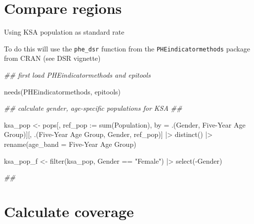 \documentclass[
  letterpaper,
  DIV=11,
  numbers=noendperiod]{scrreprt}
\newenvironment{Shaded}{\begin{snugshade}}{\end{snugshade}}
\newcommand{\AttributeTok}[1]{\textcolor[rgb]{0.40,0.45,0.13}{#1}}
\newcommand{\DocumentationTok}[1]{\textcolor[rgb]{0.37,0.37,0.37}{\textit{#1}}}
\newcommand{\ErrorTok}[1]{\textcolor[rgb]{0.68,0.00,0.00}{#1}}
\newcommand{\FunctionTok}[1]{\textcolor[rgb]{0.28,0.35,0.67}{#1}}
\newcommand{\NormalTok}[1]{\textcolor[rgb]{0.00,0.23,0.31}{#1}}
\newcommand{\OtherTok}[1]{\textcolor[rgb]{0.00,0.23,0.31}{#1}}
\newcommand{\SpecialCharTok}[1]{\textcolor[rgb]{0.37,0.37,0.37}{#1}}
\newcommand{\StringTok}[1]{\textcolor[rgb]{0.13,0.47,0.30}{#1}}
\begin{document}
\section{Compare regions}\label{compare-regions}

Using KSA population as standard rate

To do this will use the \texttt{phe\_dsr} function from the
\texttt{PHEindicatormethods} package from CRAN (see DSR vignette)

\begin{Shaded}
\begin{Highlighting}[]
\DocumentationTok{\#\# first load PHEindicatormethods and epitools}

\FunctionTok{needs}\NormalTok{(PHEindicatormethods, epitools)}

\DocumentationTok{\#\# calculate gender, age{-}specific populations for KSA}
\DocumentationTok{\#\# }

\NormalTok{ksa\_pop }\OtherTok{\textless{}{-}}\NormalTok{ pops[, ref\_pop }\SpecialCharTok{:}\ErrorTok{=} \FunctionTok{sum}\NormalTok{(Population), by }\OtherTok{=}\NormalTok{ .(Gender, }\StringTok{\textasciigrave{}}\AttributeTok{Five{-}Year Age Group}\StringTok{\textasciigrave{}}\NormalTok{)][, .(}\StringTok{\textasciigrave{}}\AttributeTok{Five{-}Year Age Group}\StringTok{\textasciigrave{}}\NormalTok{, Gender, ref\_pop)] }\SpecialCharTok{|\textgreater{}}
    \FunctionTok{distinct}\NormalTok{() }\SpecialCharTok{|\textgreater{}}
    \FunctionTok{rename}\NormalTok{(}\AttributeTok{age\_band =} \StringTok{\textasciigrave{}}\AttributeTok{Five{-}Year Age Group}\StringTok{\textasciigrave{}}\NormalTok{)}

\NormalTok{ksa\_pop\_f }\OtherTok{\textless{}{-}} \FunctionTok{filter}\NormalTok{(ksa\_pop, Gender }\SpecialCharTok{==} \StringTok{"Female"}\NormalTok{) }\SpecialCharTok{|\textgreater{}} \FunctionTok{select}\NormalTok{(}\SpecialCharTok{{-}}\NormalTok{Gender)}

\DocumentationTok{\#\# }
\end{Highlighting}
\end{Shaded}

\section{Calculate coverage}\label{calculate-coverage}
\end{document}
